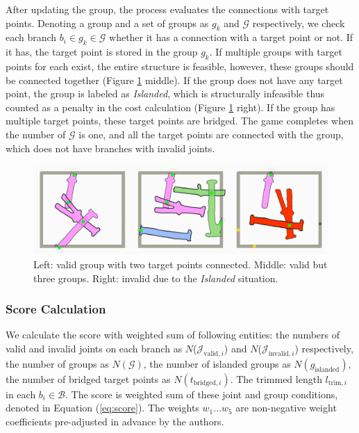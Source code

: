 After updating the group, the process evaluates the connections with target points.
Denoting a group and a set of groups as $g_k$ and $\mathcal{G}$ respectively, we check each branch $b_i \in g_k \in \mathcal{G}$ whether it has a connection with a target point or not. If it has, the target point is stored in the group $g_k$.
If multiple groups with target points for each exist, the entire structure is feasible, however, these groups should be connected together (Figure \ref{fig:group} middle).
If the group does not have any target point, the group is labeled as \textit{Islanded}, which is structurally infeasible thus counted as a penalty in the cost calculation (Figure \ref{fig:group} right).
If the group has multiple target points, these target points are bridged.
The game completes when the number of $\mathcal{G}$ is one, and all the target points are connected with the group, which does not have branches with invalid joints.

\begin{figure}[ht]
  \begin{center}
    \includegraphics[width = 0.4\paperwidth]{images/interface/groups.jpg}
    \caption{Left: valid group with two target points connected. Middle: valid but three groups. Right: invalid due to the \textit{Islanded} situation. }
    \label{fig:group}
  \end{center}
\end{figure}

\subsubsection{Score Calculation}
We calculate the score with weighted sum of following entities: the numbers of valid and invalid joints on each branch as $N$($\mathcal{J}_{\text{valid},i}$) and  $N$($\mathcal{J}_{\text{invalid},i}$) respectively, the number of groups as $N(\mathcal{G} )$, the number of islanded groups as $N(g_{\text{islanded}})$, the number of bridged target points as $N(t_{\text{bridged}, i})$.
The trimmed length $l_{\text{trim}, i}$ in each $b_i \in \mathcal{B}$.
The score is weighted sum of these joint and group conditions, denoted in Equation (\ref{eq:score}).
The weights $w_1 \dotso  w_5$ are non-negative weight coefficients pre-adjusted in advance by the authors.


